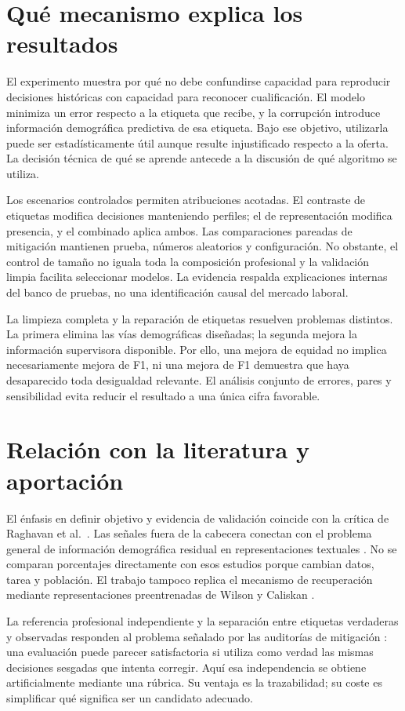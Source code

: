 \documentclass[11pt,a4paper,oneside]{report}
\begin{document}
\section{Qué mecanismo explica los resultados}
El experimento muestra por qué no debe confundirse capacidad para reproducir decisiones históricas con capacidad para reconocer cualificación. El modelo minimiza un error respecto a la etiqueta que recibe, y la corrupción introduce información demográfica predictiva de esa etiqueta. Bajo ese objetivo, utilizarla puede ser estadísticamente útil aunque resulte injustificado respecto a la oferta. La decisión técnica de qué se aprende antecede a la discusión de qué algoritmo se utiliza.

Los escenarios controlados permiten atribuciones acotadas. El contraste de etiquetas modifica decisiones manteniendo perfiles; el de representación modifica presencia, y el combinado aplica ambos. Las comparaciones pareadas de mitigación mantienen prueba, números aleatorios y configuración. No obstante, el control de tamaño no iguala toda la composición profesional y la validación limpia facilita seleccionar modelos. La evidencia respalda explicaciones internas del banco de pruebas, no una identificación causal del mercado laboral.

La limpieza completa y la reparación de etiquetas resuelven problemas distintos. La primera elimina las vías demográficas diseñadas; la segunda mejora la información supervisora disponible. Por ello, una mejora de equidad no implica necesariamente mejora de F1, ni una mejora de F1 demuestra que haya desaparecido toda desigualdad relevante. El análisis conjunto de errores, pares y sensibilidad evita reducir el resultado a una única cifra favorable.

\section{Relación con la literatura y aportación}
El énfasis en definir objetivo y evidencia de validación coincide con la crítica de Raghavan et al.\ \cite{raghavan2020}. Las señales fuera de la cabecera conectan con el problema general de información demográfica residual en representaciones textuales \cite{dearteaga2019}. No se comparan porcentajes directamente con esos estudios porque cambian datos, tarea y población. El trabajo tampoco replica el mecanismo de recuperación mediante representaciones preentrenadas de Wilson y Caliskan \cite{wilson2024}.

La referencia profesional independiente y la separación entre etiquetas verdaderas y observadas responden al problema señalado por las auditorías de mitigación \cite{sariola2026}: una evaluación puede parecer satisfactoria si utiliza como verdad las mismas decisiones sesgadas que intenta corregir. Aquí esa independencia se obtiene artificialmente mediante una rúbrica. Su ventaja es la trazabilidad; su coste es simplificar qué significa ser un candidato adecuado.
\end{document}
